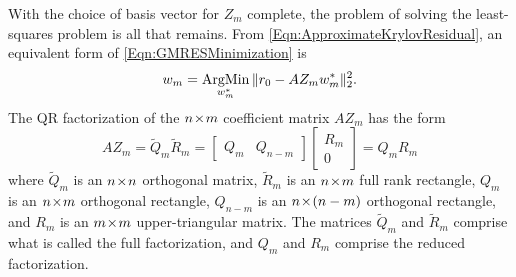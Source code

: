 \documentclass[12pt]{UWMadThesis}
\begin{document}
With the choice of basis vector for $Z_m$ complete, the problem of solving the least-squares problem is all that remains.
From \cref{Eqn:ApproximateKrylovResidual}, an equivalent form of \cref{Eqn:GMRESMinimization} is
\begin{equation}
    w_m = \operatorname*{ArgMin}_{w_m^*}\|r_0 - A Z_m w_m^*\|_2^2\label{Eqn:WeightMinimization}.
\end{equation}
The QR factorization of the $n \!\times\! m$ coefficient matrix $A Z_m$ has the form
\begin{equation}
    A Z_m
    =
    \widetilde{Q}_m \widetilde{R}_m 
    =
    \begin{bmatrix}
        Q_m & Q_{n-m}
    \end{bmatrix}
    \begin{bmatrix}
        R_m   \\
        0
    \end{bmatrix} = 
        Q_m R_m
\end{equation}
where $\widetilde{Q}_m$ is an $n \!\times\! n$ orthogonal matrix, $\widetilde{R}_m$ is an $n \!\times\! m$ full rank rectangle, $Q_m$ is an $n \!\times\! m$ orthogonal rectangle, $Q_{n-m}$ is an $n \!\times\! (n-m)$ orthogonal rectangle, and $R_m$ is an $m \!\times\! m$ upper-triangular matrix.
The matrices $\widetilde{Q}_m$ and $\widetilde{R}_m$ comprise what is called the full factorization, and $Q_m$ and $R_m$ comprise the reduced factorization.
\end{document}
